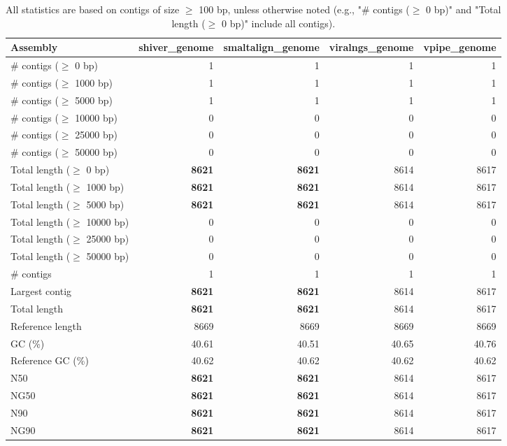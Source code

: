 \documentclass[12pt,a4paper]{article}
\begin{document}
\begin{table}[ht]
\begin{center}
\caption{All statistics are based on contigs of size $\geq$ 100 bp, unless otherwise noted (e.g., "\# contigs ($\geq$ 0 bp)" and "Total length ($\geq$ 0 bp)" include all contigs).}
\begin{tabular}{|l*{4}{|r}|}
\hline
Assembly & shiver\_genome & smaltalign\_genome & viralngs\_genome & vpipe\_genome \\ \hline
\# contigs ($\geq$ 0 bp) & 1 & 1 & 1 & 1 \\ \hline
\# contigs ($\geq$ 1000 bp) & 1 & 1 & 1 & 1 \\ \hline
\# contigs ($\geq$ 5000 bp) & 1 & 1 & 1 & 1 \\ \hline
\# contigs ($\geq$ 10000 bp) & 0 & 0 & 0 & 0 \\ \hline
\# contigs ($\geq$ 25000 bp) & 0 & 0 & 0 & 0 \\ \hline
\# contigs ($\geq$ 50000 bp) & 0 & 0 & 0 & 0 \\ \hline
Total length ($\geq$ 0 bp) & {\bf 8621} & {\bf 8621} & 8614 & 8617 \\ \hline
Total length ($\geq$ 1000 bp) & {\bf 8621} & {\bf 8621} & 8614 & 8617 \\ \hline
Total length ($\geq$ 5000 bp) & {\bf 8621} & {\bf 8621} & 8614 & 8617 \\ \hline
Total length ($\geq$ 10000 bp) & 0 & 0 & 0 & 0 \\ \hline
Total length ($\geq$ 25000 bp) & 0 & 0 & 0 & 0 \\ \hline
Total length ($\geq$ 50000 bp) & 0 & 0 & 0 & 0 \\ \hline
\# contigs & 1 & 1 & 1 & 1 \\ \hline
Largest contig & {\bf 8621} & {\bf 8621} & 8614 & 8617 \\ \hline
Total length & {\bf 8621} & {\bf 8621} & 8614 & 8617 \\ \hline
Reference length & 8669 & 8669 & 8669 & 8669 \\ \hline
GC (\%) & 40.61 & 40.51 & 40.65 & 40.76 \\ \hline
Reference GC (\%) & 40.62 & 40.62 & 40.62 & 40.62 \\ \hline
N50 & {\bf 8621} & {\bf 8621} & 8614 & 8617 \\ \hline
NG50 & {\bf 8621} & {\bf 8621} & 8614 & 8617 \\ \hline
N90 & {\bf 8621} & {\bf 8621} & 8614 & 8617 \\ \hline
NG90 & {\bf 8621} & {\bf 8621} & 8614 & 8617 \\ \hline

\end{tabular}
\end{center}
\end{table}
\end{document}
